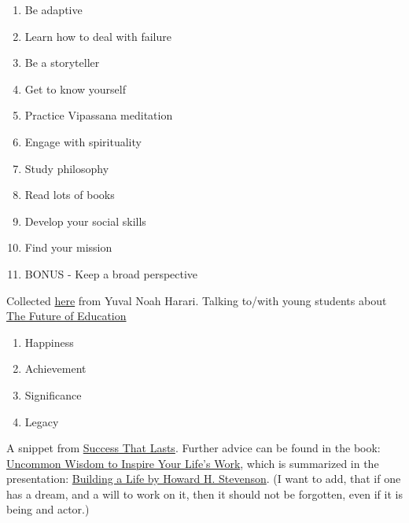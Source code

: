 \documentclass{article}
\begin{document}
\begin{minipage}[t]{0.45\textwidth}

\begin{enumerate}
    \item Be adaptive
    \item Learn how to deal with failure
    \item Be a storyteller
    \item Get to know yourself
    \item Practice Vipassana meditation
    \item Engage with spirituality
    \item Study philosophy
    \item Read lots of books
    \item Develop your social skills
    \item Find your mission
    \item BONUS - Keep a broad perspective
\end{enumerate}

Collected \href{https://www.youtube.com/watch?v=2tEgpgeErRg}{here} from Yuval Noah Harari.
Talking to/with young students about \href{https://www.youtube.com/watch?v=j0uw7Xc0fLk}{The Future of Education} 

\end{minipage}
\hfill
\begin{minipage}[t]{0.45\textwidth}


\begin{enumerate}
    \item Happiness
    \item Achievement
    \item Significance
    \item Legacy
\end{enumerate}

A snippet from
\href{https://hbr.org/2004/02/success-that-lasts}{Success That Lasts}.
Further advice can be found in  the book:
\href{https://www.goodreads.com/book/show/13538833-howard-s-gift}{Uncommon Wisdom to Inspire Your Life's Work}, which is summarized in the presentation:
\href{https://www.youtube.com/watch?v=wLn28DrSF68}{Building a Life by Howard H. Stevenson}.
(I want to add, that if one has a dream, and a will to work on it, then it should not be forgotten, even if it is being and actor.)

\end{minipage}

\vspace{12 pt}
\end{document}

